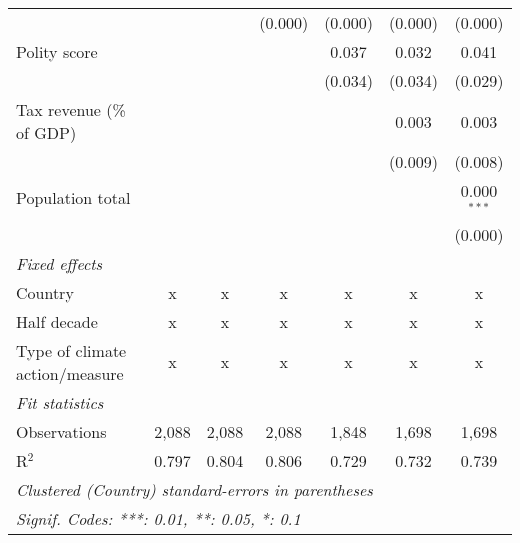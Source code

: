 \begin{tabular}{lcccccc}
                                                                              &              &                & (0.000)        & (0.000)        & (0.000)        & (0.000)\\   
   Polity score                                                               &              &                &                & 0.037          & 0.032          & 0.041\\   
                                                                              &              &                &                & (0.034)        & (0.034)        & (0.029)\\   
   Tax revenue (\% of GDP)                                                    &              &                &                &                & 0.003          & 0.003\\   
                                                                              &              &                &                &                & (0.009)        & (0.008)\\   
   Population total                                                           &              &                &                &                &                & 0.000$^{***}$\\   
                                                                              &              &                &                &                &                & (0.000)\\   
   \emph{Fixed effects}\\
   Country                                                                    & x            & x              & x              & x              & x              & x\\  
   Half decade                                                                & x            & x              & x              & x              & x              & x\\  
   Type of climate action/measure                                             & x            & x              & x              & x              & x              & x\\  
   \midrule \emph{Fit statistics}\\
   Observations                                                               & 2,088        & 2,088          & 2,088          & 1,848          & 1,698          & 1,698\\  
   R$^2$                                                                      & 0.797        & 0.804          & 0.806          & 0.729          & 0.732          & 0.739\\  
   \midrule
   \multicolumn{7}{l}{\emph{Clustered (Country) standard-errors in parentheses}}\\
   \multicolumn{7}{l}{\emph{Signif. Codes: ***: 0.01, **: 0.05, *: 0.1}}\\
\end{tabular}
\par\endgroup


